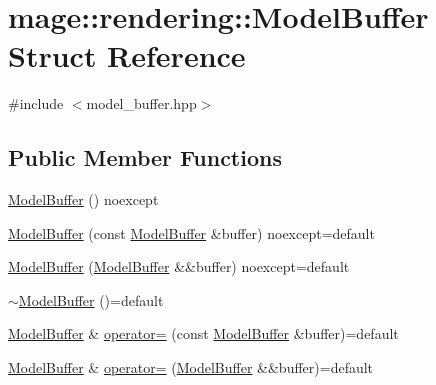 \hypertarget{structmage_1_1rendering_1_1_model_buffer}{}\section{mage\+:\+:rendering\+:\+:Model\+Buffer Struct Reference}
\label{structmage_1_1rendering_1_1_model_buffer}


{\ttfamily \#include $<$model\+\_\+buffer.\+hpp$>$}

\subsection*{Public Member Functions}
\begin{DoxyCompactItemize}
\item 
\hyperlink{structmage_1_1rendering_1_1_model_buffer_a31cc9c498bbb467b45d7a440e744ece4}{Model\+Buffer} () noexcept
\item 
\hyperlink{structmage_1_1rendering_1_1_model_buffer_a2a70d56be64cc621e61e056fb08d6905}{Model\+Buffer} (const \hyperlink{structmage_1_1rendering_1_1_model_buffer}{Model\+Buffer} \&buffer) noexcept=default
\item 
\hyperlink{structmage_1_1rendering_1_1_model_buffer_aa562199c2433c47baabaf32743b1a124}{Model\+Buffer} (\hyperlink{structmage_1_1rendering_1_1_model_buffer}{Model\+Buffer} \&\&buffer) noexcept=default
\item 
\hyperlink{structmage_1_1rendering_1_1_model_buffer_a8234e3377ffe079b8ac045198d8cdbc1}{$\sim$\+Model\+Buffer} ()=default
\item 
\hyperlink{structmage_1_1rendering_1_1_model_buffer}{Model\+Buffer} \& \hyperlink{structmage_1_1rendering_1_1_model_buffer_a7435706a5297e1dfac59ac3c24a8e168}{operator=} (const \hyperlink{structmage_1_1rendering_1_1_model_buffer}{Model\+Buffer} \&buffer)=default
\item 
\hyperlink{structmage_1_1rendering_1_1_model_buffer}{Model\+Buffer} \& \hyperlink{structmage_1_1rendering_1_1_model_buffer_a083377a5af4c7b14c2db8659824789ff}{operator=} (\hyperlink{structmage_1_1rendering_1_1_model_buffer}{Model\+Buffer} \&\&buffer)=default
\end{DoxyCompactItemize}
